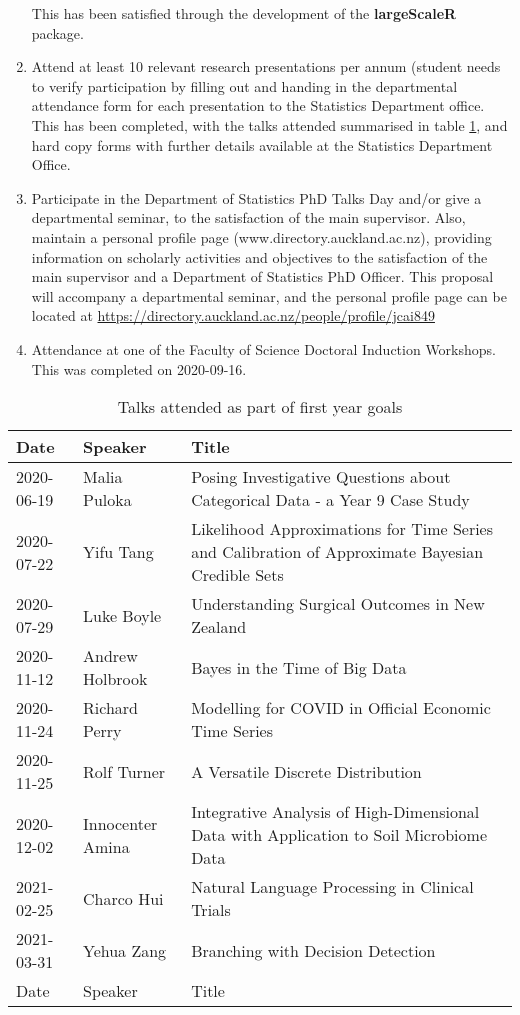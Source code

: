 \documentclass[a4paper,10pt]{article}
\begin{document}
\begin{enumerate}
		This has been satisfied through the development of the \textbf{largeScaleR} package.
	\item Attend at least 10 relevant research presentations per annum (student needs to verify participation by filling out and handing in the departmental attendance form for each presentation to the Statistics Department office.
		This has been completed, with the talks attended summarised in table \ref{talks}, and hard copy forms with further details available at the Statistics Department Office.
	\item Participate in the Department of Statistics PhD Talks Day and/or give a departmental seminar, to the satisfaction of the main supervisor. 
		Also, maintain a personal profile page (www.directory.auckland.ac.nz), providing information on scholarly activities and objectives to the satisfaction of the main supervisor and a Department of Statistics PhD Officer.
		This proposal will accompany a departmental seminar, and the personal profile page can be located at \url{https://directory.auckland.ac.nz/people/profile/jcai849}
	\item Attendance at one of the Faculty of Science Doctoral Induction Workshops.
		This was completed  on 2020-09-16.
\end{enumerate}

\begin{table}
	\begin{tabular}{lll}
		\toprule
		Date & Speaker & Title\\
		\midrule
		2020-06-19 & Malia Puloka & Posing Investigative Questions about Categorical Data - a Year 9 Case Study\\
		2020-07-22 & Yifu Tang & Likelihood Approximations for Time Series and Calibration of Approximate Bayesian Credible Sets\\
		2020-07-29 & Luke Boyle & Understanding Surgical Outcomes in New Zealand\\
		2020-11-12 & Andrew Holbrook & Bayes in the Time of Big Data\\
		2020-11-24 & Richard Perry & Modelling for COVID in Official Economic Time Series\\
		2020-11-25 & Rolf Turner & A Versatile Discrete Distribution\\
		2020-12-02 & Innocenter Amina & Integrative Analysis of High-Dimensional Data with Application to Soil Microbiome Data\\
		2021-02-25 & Charco Hui & Natural Language Processing in Clinical Trials\\
		2021-03-31 & Yehua Zang & Branching with Decision Detection\\
		Date & Speaker & Title\\
		\bottomrule
	\end{tabular}
	\caption{\label{talks}Talks attended as part of first year goals}
\end{table}
\end{document}
